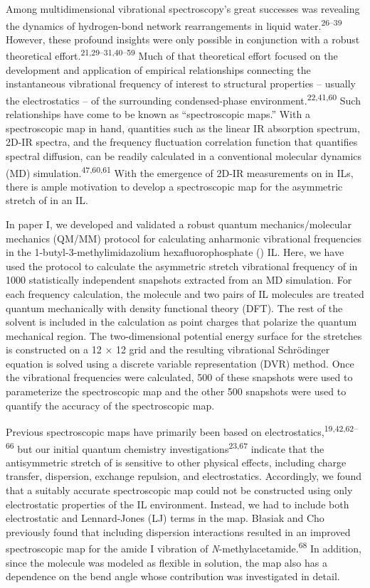 \documentclass[]{article}
\begin{document}
Among multidimensional vibrational spectroscopy's great successes was revealing the dynamics of hydrogen-bond network rearrangements in liquid water.\textsuperscript{26--39} However, these profound insights were only possible in conjunction with a robust theoretical effort.\textsuperscript{21,29--31,40--59} Much of that theoretical effort focused on the development and application of empirical relationships connecting the instantaneous vibrational frequency of interest to structural properties -- usually the electrostatics -- of the surrounding condensed-phase environment.\textsuperscript{22,41,60} Such relationships have come to be known as ``spectroscopic maps.'' With a spectroscopic map in hand, quantities such as the linear IR absorption spectrum, 2D-IR spectra, and the frequency fluctuation correlation function that quantifies spectral diffusion, can be readily calculated in a conventional molecular dynamics (MD) simulation.\textsuperscript{47,60,61} With the emergence of 2D-IR measurements on  in ILs, there is ample motivation to develop a spectroscopic map for the asymmetric stretch of  in an IL.

In paper I, we developed and validated a robust quantum mechanics/molecular mechanics (QM/MM) protocol for calculating anharmonic  vibrational frequencies in the 1-butyl-3-methylimidazolium hexafluorophosphate (\ce{[C4C1im][PF6]}) IL. Here, we have used the protocol to calculate the asymmetric stretch vibrational frequency of  in 1000 statistically independent snapshots extracted from an MD simulation. For each frequency calculation, the  molecule and two pairs of IL molecules are treated quantum mechanically with density functional theory (DFT). The rest of the solvent is included in the calculation as point charges that polarize the quantum mechanical region. The two-dimensional potential energy surface for the  stretches is constructed on a 12 × 12 grid and the resulting vibrational Schrödinger equation is solved using a discrete variable representation (DVR) method. Once the vibrational frequencies were calculated, 500 of these snapshots were used to parameterize the spectroscopic map and the other 500 snapshots were used to quantify the accuracy of the spectroscopic map.

Previous spectroscopic maps have primarily been based on electrostatics,\textsuperscript{19,42,62--66} but our initial quantum chemistry investigations\textsuperscript{23,67} indicate that the antisymmetric stretch of  is sensitive to other physical effects, including charge transfer, dispersion, exchange repulsion, and electrostatics. Accordingly, we found that a suitably accurate spectroscopic map could not be constructed using only electrostatic properties of the IL environment. Instead, we had to include both electrostatic and Lennard-Jones (LJ) terms in the map.  Błasiak and Cho previously found that including dispersion interactions resulted in an improved spectroscopic map for the amide I vibration of \textit{N}-methylacetamide.\textsuperscript{68} In addition, since the  molecule was modeled as flexible in solution, the map also has a dependence on the  bend angle whose contribution was investigated in detail.
\end{document}
